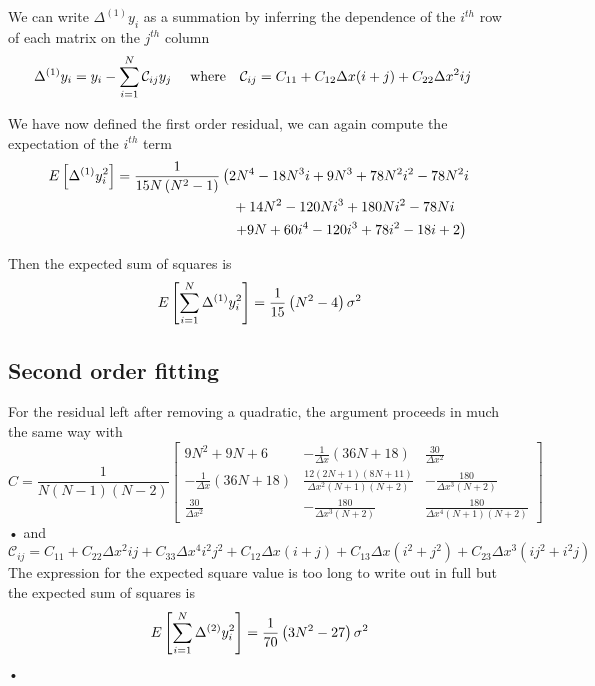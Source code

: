 We can write $\Delta^{(1)} y_{i}$ as a summation by inferring the dependence of the
$i^{th}$ row of each matrix on the $j^{th}$ column
\begin{align}
\Delta^{(1)} y_{i} & = y_{i} - \sum_{i=1}^{N}\mathcal{C}_{ij} y_{j}
& \textrm{ where} &&
\mathcal{C}_{ij} & = C_{11} + C_{12}\Delta x (i+j) + C_{22}\Delta x^{2} ij
\end{align}

We have now defined the first order residual, we can again compute the expectation
of the $i^{th}$ term
\begin{align}
\begin{split}
E\left[\Delta^{(1)} y^{2}_{i}\right]  =
\frac{1}{15 N \left(N^{2} - 1\right)} &
\left(2 N^{4} - 18 N^{3} i + 9 N^{3} + 78 N^{2} i^{2} - 78 N^{2} i \right.\\
      &\hspace{3mm} + 14 N^{2} - 120 N i^{3} + 180 N i^{2} - 78 N i \\
      &\hspace{3mm} \left. + 9 N + 60 i^{4} - 120 i^{3} + 78 i^{2} - 18 i + 2\right)
\end{split}
\end{align}

Then the expected sum of squares is
\begin{equation}
E\left[\sum_{i=1}^{N} \Delta^{(1)} y_{i}^{2}\right] = \frac{1}{15}\left(N^{2} -4\right)\sigma^{2}
\label{eqn: sum of squares k1}
\end{equation}

\subsection{Second order fitting}
For the residual left after removing a quadratic, the  argument proceeds in much
the same way with
\begin{equation}
C = \frac{1}{N(N-1)(N-2)}
\left[\begin{matrix}9 N^{2} + 9 N + 6 & - \frac{1}{\Delta{x}} \left(36 N + 18\right) & \frac{30}{\Delta{x}^{2}}\\- \frac{1}{\Delta{x}} \left(36 N + 18\right) & \frac{12 \left(2 N + 1\right) \left(8 N + 11\right)}{\Delta{x}^{2} \left(N + 1\right) \left(N + 2\right)} & - \frac{180}{\Delta{x}^{3} \left(N + 2\right)}\\\frac{30}{\Delta{x}^{2}} & - \frac{180}{\Delta{x}^{3} \left(N + 2\right)} & \frac{180}{\Delta{x}^{4} \left(N + 1\right) \left(N + 2\right)}\end{matrix}\right]
\label{eqn: C_2}
\end{equation}•
and
\begin{equation}
\mathcal{C}_{ij} = C_{11} + C_{22}\Delta x^{2}ij + C_{33}\Delta x^{4}i^{2}j^{2} + C_{12}\Delta x(i+j) + C_{13}\Delta x (i^{2} + j^2) + C_{23}\Delta x^{3}(ij^{2} + i^{2}j)
\label{eqn: MCC_2}
\end{equation}
The expression for the expected square value is too long to write out in full
but the expected sum of squares is
\begin{equation}
E\left[\sum_{i=1}^{N} \Delta^{(2)} y_{i}^{2}\right] = \frac{1}{70}\left(3N^{2} -27\right)\sigma^{2}
\label{eqn: sum of squares k2}
\end{equation}•

